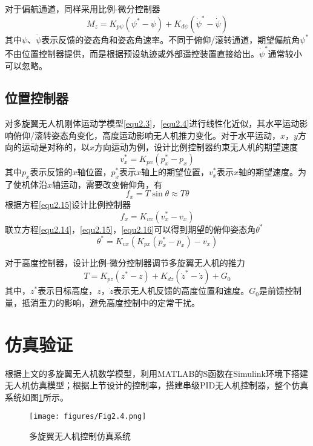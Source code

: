 对于偏航通道，同样采用比例-微分控制器
\begin{equation}
\label{equ2.13}
M_z = K_{p\psi} \left( \psi^* - \psi \right) + K_{d\psi} \left( \dot{\psi}^* -  \dot{\psi} \right)
\end{equation}
其中$\psi$、$\dot{\psi}$表示反馈的姿态角和姿态角速率。不同于俯仰/滚转通道，期望偏航角$\psi^*$不由位置控制器提供，而是根据预设轨迹或外部遥控装置直接给出。$ \dot{\psi}^*$通常较小可以忽略。

\subsection{位置控制器}
对多旋翼无人机刚体运动学模型\eqref{equ2.3}，\eqref{equ2.4}进行线性化近似，其水平运动影响俯仰/滚转姿态角变化，高度运动影响无人机推力变化。对于水平运动，$x$，$y$方向的运动是对称的，以$x$方向运动为例，设计比例控制器约束无人机的期望速度
\begin{equation}
\label{equ2.14}
v_x^* =  K_{px} \left( p_x^* - p_x \right)
\end{equation}
其中$p_x $表示反馈的$x$轴位置，$p_x^*$表示$x$轴上的期望位置，$v_x^*$表示$x$轴的期望速度。为了使机体沿$x$轴运动，需要改变俯仰角，有
\begin{equation}
\label{equ2.15}
f_x = T \sin\theta \approx T \theta
\end{equation}
根据方程\eqref{equ2.15}设计比例控制器
\begin{equation}
f_x = K_{vx} \left(  v_x^* - v_x \right)
\end{equation}
联立方程\eqref{equ2.14}，\eqref{equ2.15}，\eqref{equ2.16}可以得到期望的俯仰姿态角$\theta^*$
\begin{equation}
\label{equ2.16}
\theta^* = K_{vx} \left( K_{px} \left( p_x^* - p_x \right) - v_x \right)
\end{equation}

对于高度控制器，设计比例-微分控制器调节多旋翼无人机的推力
\begin{equation}
\label{equ2.17}
T = K_{pz} \left( z^* -z  \right) + K_{dz} \left( \dot{z}^* - \dot{z}  \right) + G_0
\end{equation}
其中，$z^*$表示目标高度，$z$，$\dot{z}$表示无人机反馈的高度位置和速度。$G_0$是前馈控制量，抵消重力的影响，避免高度控制中的定常干扰。

\section{仿真验证}
根据上文的多旋翼无人机数学模型，利用MATLAB的S函数在Simulink\upcite{[2.6]}环境下搭建无人机仿真模型；根据上节设计的控制率，搭建串级PID无人机控制器，整个仿真系统如图\ref{fig2.4}所示。
\begin{figure}[h]
\centering
\texttt{[image: figures/Fig2.4.png]}
\caption{多旋翼无人机控制仿真系统}
\label{fig2.4}
\end{figure}

